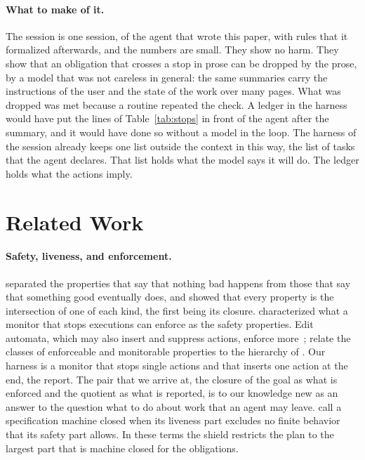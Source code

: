 \documentclass[acmsmall,nonacm,screen]{acmart}
\begin{document}
\paragraph{What to make of it.} The session is one session, of the agent that wrote this
paper, with rules that it formalized afterwards, and the numbers are small. They show no
harm. They show that an obligation that crosses a stop in prose can be dropped by the
prose, by a model that was not careless in general: the same summaries carry the
instructions of the user and the state of the work over many pages. What was dropped was
met because a routine repeated the check. A ledger in the harness would have put the lines
of Table~\ref{tab:stops} in front of the agent after the summary, and it would have done
so without a model in the loop. The harness of the session already keeps one list outside
the context in this way, the list of tasks that the agent declares. That list holds what the
model says it will do. The ledger holds what the actions imply.

\section{Related Work}
\label{sec:related}

\paragraph{Safety, liveness, and enforcement.} \citet{lamport1977} separated the properties
that say that nothing bad happens from those that say that something good eventually does,
and \citet{alpern1985} showed that every property is the intersection of one of each kind,
the first being its closure. \citet{schneider2000} characterized what a monitor that stops
executions can enforce as the safety properties. Edit automata, which may also insert and
suppress actions, enforce more~\cite{ligatti2009}; \citet{falcone2012} relate the classes
of enforceable and monitorable properties to the hierarchy of \citet{manna1990}. Our harness
is a monitor that stops single actions and that inserts one action at the end, the report.
The pair that we arrive at, the closure of the goal as what is enforced and the quotient as
what is reported, is to our knowledge new as an answer to the question what to do about
work that an agent may leave. \citet{abadi1991} call a specification machine closed when
its liveness part excludes no finite behavior that its safety part allows. In these terms
the shield restricts the plan to the largest part that is machine closed for the
obligations.
\end{document}
